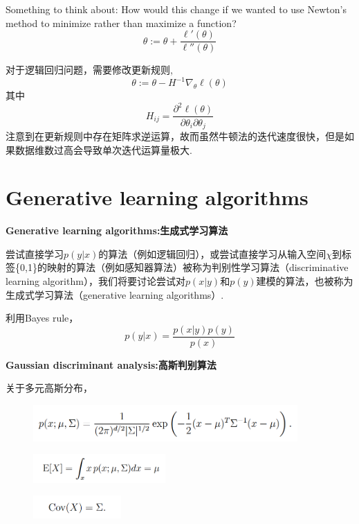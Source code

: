 \documentclass[12pt, a4paper, oneside]{ctexbook}
\begin{document}
Something to think about: How would this change if we wanted to use
Newton’s method to minimize rather than maximize a function?\[\theta:=\theta+\dfrac{\ell '(\theta)}{\ell ''(\theta)}\]

对于逻辑回归问题，需要修改更新规则,\[\theta:=\theta-H^{-1}\nabla_{\theta}\ell(\theta)\]其中\[H_{ij}=\dfrac{\partial ^2 \ell(\theta)}{\partial \theta_i \partial \theta_j}\]注意到在更新规则中存在矩阵求逆运算，故而虽然牛顿法的迭代速度很快，但是如果数据维数过高会导致单次迭代运算量极大.

\section{Generative learning algorithms}

\textbf{Generative learning algorithms:生成式学习算法}

尝试直接学习$p(y|x)$的算法（例如逻辑回归），或尝试直接学习从输入空间$\chi$到标签\{0,1\}的映射的算法（例如感知器算法）被称为判别性学习算法（discriminative learning algorithm），我们将要讨论尝试对$p(x|y)$和$p(y)$建模的算法，也被称为生成式学习算法（generative learning algorithms）.

利用Bayes rule，\[p(y|x)=\dfrac{p(x|y)p(y)}{p(x)}\]

\hspace*{\fill}

\textbf{Gaussian discriminant analysis:高斯判别算法}

关于多元高斯分布，

  \begin{figure}[ht]
		\centering 
		\includegraphics[width=0.9\textwidth]{images29.png} 
	\end{figure}

  \begin{figure}[ht]
		\centering 
		\includegraphics[width=0.45\textwidth]{images30.png} 
	\end{figure}

  \begin{figure}[ht]
		\centering 
		\includegraphics[width=0.3\textwidth]{images31.png} 
	\end{figure}
\end{document}
